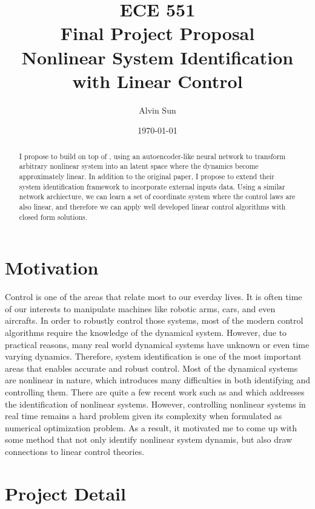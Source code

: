 \documentclass[12pt]{article}
\title{ECE 551 \\ Final Project Proposal \\ Nonlinear System Identification with Linear Control}
\author{Alvin Sun}
\date{\today}
\begin{document}
\maketitle

\begin{abstract}
  I propose to build on top of \cite{lusch2018deep}, using an autoencoder-like neural network
  to transform arbitrary nonlinear system into an latent space where the dynamics
  become approximately linear. In addition to the original paper, I propose to extend their
  system identification framework to incorporate external inputs data. Using a similar
  network archiecture, we can learn a set of coordinate system where the control
  laws are also linear, and therefore we can apply well developed linear control algorithms
  with closed form solutions.
\end{abstract}

\section{Motivation}

Control is one of the areas that relate most to our everday lives. It is often time of our
interests to manipulate machines like robotic arms, cars, and even aircrafts. In order
to robustly control those systems, most of the modern control algorithms require the knowledge
of the dynamical system. However, due to practical reasons, many real world dynamical
systems have unknown or even time varying dynamics. Therefore, system identification is
one of the most important areas that enables accurate and robust control. Most of the dynamical
systems are nonlinear in nature, which introduces many difficulties in both identifying
and controlling them. There are quite a few recent work such as \cite{brunton2016discovering}
and \cite{Champion22445} which addresses the identification of nonlinear systems. However,
controlling nonlinear systems in real time remains a hard problem given its
complexity when formulated as numerical optimization problem. As a result, it motivated
me to come up with some method that not only identify nonlinear system dynamis, but also
draw connections to linear control theories.

\section{Project Detail}
\end{document}
